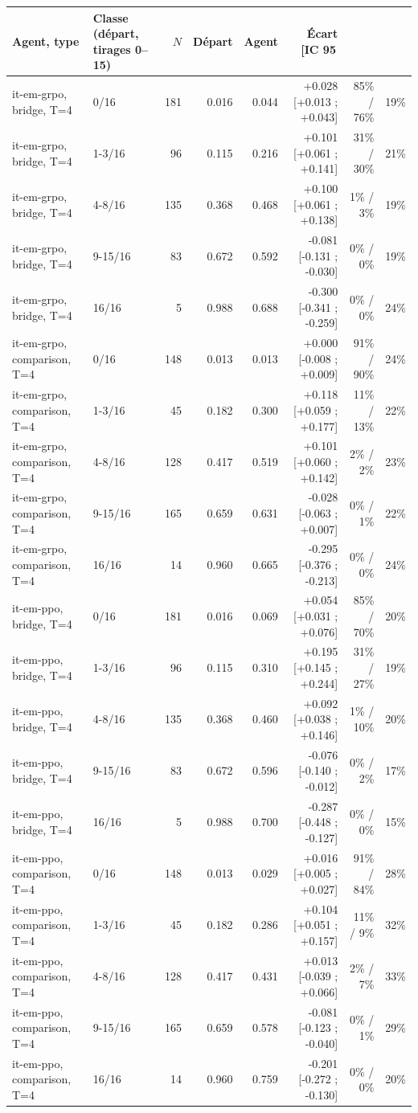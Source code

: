 \begin{tabular}{llrrrrrr}
\toprule
Agent, type & Classe (départ, tirages 0--15) & $N$ & Départ & Agent & Écart [IC 95\,\\%
\midrule
it-em-grpo, bridge, T=4 & 0/16 & 181 & 0.016 & 0.044 & +0.028 [+0.013 ; +0.043] & 85\% / 76\% & 19\% \\
it-em-grpo, bridge, T=4 & 1-3/16 & 96 & 0.115 & 0.216 & +0.101 [+0.061 ; +0.141] & 31\% / 30\% & 21\% \\
it-em-grpo, bridge, T=4 & 4-8/16 & 135 & 0.368 & 0.468 & +0.100 [+0.061 ; +0.138] & 1\% / 3\% & 19\% \\
it-em-grpo, bridge, T=4 & 9-15/16 & 83 & 0.672 & 0.592 & -0.081 [-0.131 ; -0.030] & 0\% / 0\% & 19\% \\
it-em-grpo, bridge, T=4 & 16/16 & 5 & 0.988 & 0.688 & -0.300 [-0.341 ; -0.259] & 0\% / 0\% & 24\% \\
\midrule
it-em-grpo, comparison, T=4 & 0/16 & 148 & 0.013 & 0.013 & +0.000 [-0.008 ; +0.009] & 91\% / 90\% & 24\% \\
it-em-grpo, comparison, T=4 & 1-3/16 & 45 & 0.182 & 0.300 & +0.118 [+0.059 ; +0.177] & 11\% / 13\% & 22\% \\
it-em-grpo, comparison, T=4 & 4-8/16 & 128 & 0.417 & 0.519 & +0.101 [+0.060 ; +0.142] & 2\% / 2\% & 23\% \\
it-em-grpo, comparison, T=4 & 9-15/16 & 165 & 0.659 & 0.631 & -0.028 [-0.063 ; +0.007] & 0\% / 1\% & 22\% \\
it-em-grpo, comparison, T=4 & 16/16 & 14 & 0.960 & 0.665 & -0.295 [-0.376 ; -0.213] & 0\% / 0\% & 24\% \\
\midrule
it-em-ppo, bridge, T=4 & 0/16 & 181 & 0.016 & 0.069 & +0.054 [+0.031 ; +0.076] & 85\% / 70\% & 20\% \\
it-em-ppo, bridge, T=4 & 1-3/16 & 96 & 0.115 & 0.310 & +0.195 [+0.145 ; +0.244] & 31\% / 27\% & 19\% \\
it-em-ppo, bridge, T=4 & 4-8/16 & 135 & 0.368 & 0.460 & +0.092 [+0.038 ; +0.146] & 1\% / 10\% & 20\% \\
it-em-ppo, bridge, T=4 & 9-15/16 & 83 & 0.672 & 0.596 & -0.076 [-0.140 ; -0.012] & 0\% / 2\% & 17\% \\
it-em-ppo, bridge, T=4 & 16/16 & 5 & 0.988 & 0.700 & -0.287 [-0.448 ; -0.127] & 0\% / 0\% & 15\% \\
\midrule
it-em-ppo, comparison, T=4 & 0/16 & 148 & 0.013 & 0.029 & +0.016 [+0.005 ; +0.027] & 91\% / 84\% & 28\% \\
it-em-ppo, comparison, T=4 & 1-3/16 & 45 & 0.182 & 0.286 & +0.104 [+0.051 ; +0.157] & 11\% / 9\% & 32\% \\
it-em-ppo, comparison, T=4 & 4-8/16 & 128 & 0.417 & 0.431 & +0.013 [-0.039 ; +0.066] & 2\% / 7\% & 33\% \\
it-em-ppo, comparison, T=4 & 9-15/16 & 165 & 0.659 & 0.578 & -0.081 [-0.123 ; -0.040] & 0\% / 1\% & 29\% \\
it-em-ppo, comparison, T=4 & 16/16 & 14 & 0.960 & 0.759 & -0.201 [-0.272 ; -0.130] & 0\% / 0\% & 20\% \\
\bottomrule
\end{tabular}
